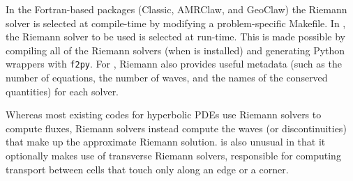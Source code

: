 In the Fortran-based packages (Classic, AMRClaw, and GeoClaw) the Riemann
solver is selected at compile-time by modifying a problem-specific Makefile.
In \pyclaw, the Riemann solver to be used is selected at run-time.  This is
made possible by compiling all of the Riemann solvers (when \pyclaw is installed)
and generating Python wrappers with \texttt{f2py}.  For \pyclaw, Riemann also provides
useful metadata (such as the number of equations, the number of waves, and
the names of the conserved quantities) for each solver.

Whereas most existing codes for hyperbolic PDEs use Riemann solvers to
compute fluxes, \clawpack Riemann solvers instead compute the waves 
(or discontinuities) that make up the approximate Riemann solution.
\clawpack is also unusual in that it optionally makes use of transverse
Riemann solvers, responsible for computing transport between cells that
touch only along an edge or a corner.
